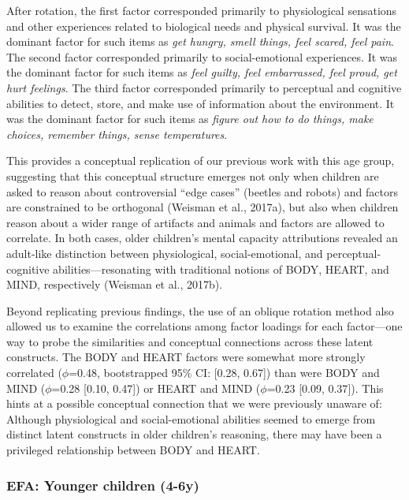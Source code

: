 \documentclass[10pt, letterpaper]{article}
\begin{document}
After rotation, the first factor corresponded primarily to physiological
sensations and other experiences related to biological needs and
physical survival. It was the dominant factor for such items as
\emph{get hungry, smell things, feel scared, feel pain}. The second
factor corresponded primarily to social-emotional experiences. It was
the dominant factor for such items as \emph{feel guilty, feel
embarrassed, feel proud, get hurt feelings}. The third factor
corresponded primarily to perceptual and cognitive abilities to detect,
store, and make use of information about the environment. It was the
dominant factor for such items as \emph{figure out how to do things,
make choices, remember things, sense temperatures}.

This provides a conceptual replication of our previous work with this
age group, suggesting that this conceptual structure emerges not only
when children are asked to reason about controversial ``edge cases''
(beetles and robots) and factors are constrained to be orthogonal
(Weisman et al., 2017a), but also when children reason about a wider
range of artifacts and animals and factors are allowed to correlate. In
both cases, older children's mental capacity attributions revealed an
adult-like distinction between physiological, social-emotional, and
perceptual-cognitive abilities---resonating with traditional notions of
BODY, HEART, and MIND, respectively (Weisman et al., 2017b).

Beyond replicating previous findings, the use of an oblique rotation
method also allowed us to examine the correlations among factor loadings
for each factor---one way to probe the similarities and conceptual
connections across these latent constructs. The BODY and HEART factors
were somewhat more strongly correlated (\(\phi\)=0.48, bootstrapped 95\%
CI: {[}0.28, 0.67{]}) than were BODY and MIND (\(\phi\)=0.28 {[}0.10,
0.47{]}) or HEART and MIND (\(\phi\)=0.23 {[}0.09, 0.37{]}). This hints
at a possible conceptual connection that we were previously unaware of:
Although physiological and social-emotional abilities seemed to emerge
from distinct latent constructs in older children's reasoning, there may
have been a privileged relationship between BODY and HEART.

\subsubsection{EFA: Younger children
(4-6y)}\label{efa-younger-children-4-6y}
\end{document}
